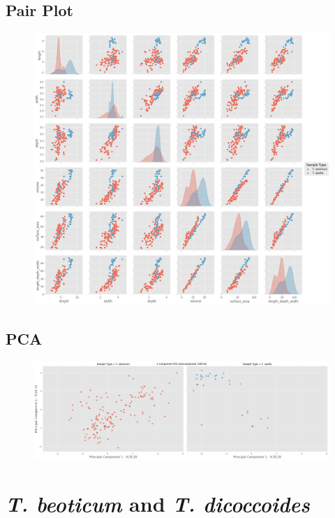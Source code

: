 \documentclass[11pt]{report}
\begin{document}
\subsection{Pair Plot}
\label{sec:org250e325}

\begin{figure}[htbp]
\centering
\includegraphics[width=18cm]{./images/results/group3/pairplot.png}
\label{fig:orgc6fc05e}
\end{figure}

\clearpage
\subsection{PCA}
\label{sec:orgf387a8d}
\begin{figure}[htbp]
\centering
\includegraphics[width=18cm]{./images/results/group3/pca.png}
\label{fig:org41f22fb}
\end{figure}


\clearpage
\section{\emph{T. beoticum} and \emph{T. dicoccoides}}
\label{sec:orgd8dcff0}
\end{document}
